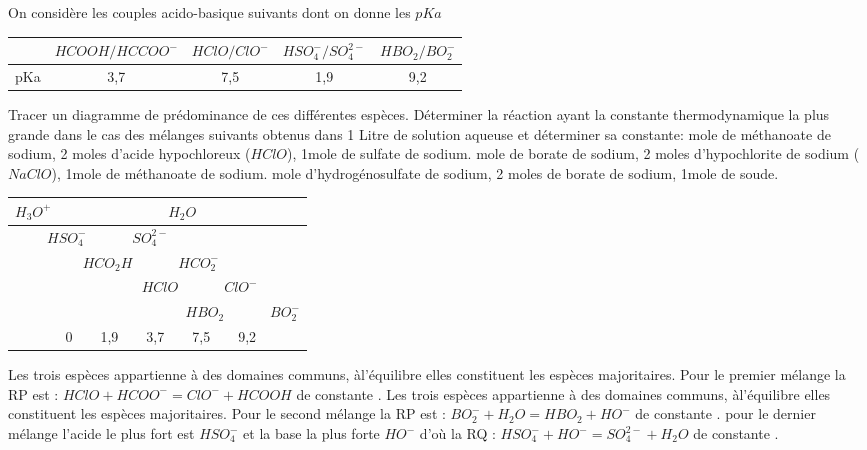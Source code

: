 \begin{Exercise}[title=]
	On considère  les couples acido-basique suivants dont on donne les $pKa$
	\begin{center}
		\begin{tabular}{c|c|c|c|c|}
		 &$HCOOH/HCCOO^-$ & $HClO/ClO^-$ & $HSO_4^-/SO_4^{2-}$ &$HBO_2/BO_2^-$\\
		 \hline
		 pKa & 3,7 & 7,5 & 1,9 & 9,2
	\end{tabular}
	\end{center}
\Question Tracer un diagramme de prédominance de ces différentes espèces.
\Question Déterminer la réaction ayant la constante thermodynamique la plus grande dans le cas des mélanges suivants obtenus dans 1 Litre de solution aqueuse et déterminer sa constante:
 mole de méthanoate de sodium, 2 moles d'acide hypochloreux ($HClO$), 1mole de sulfate de sodium.
 mole de borate de sodium, 2 moles d'hypochlorite de sodium ($NaClO$), 1mole de méthanoate de sodium.
 mole d'hydrogénosulfate de sodium, 2 moles de borate de sodium, 1mole de soude.

\end{Exercise}
\begin{Answer}
	\Question
\begin{center}
\begin{tabular}{cccccccccccc}
 	$H_3O^+$&\vline &\multicolumn{9}{c}{$H_2O$}	 								 \\ \hline
	\multicolumn{3}{r}{ $HSO_4^-$ }	&\vline & \multicolumn{7}{l}{$SO_4^{2-}$}	 \\ \hline
	\multicolumn{5}{r}{$HCO_2H$}	&\vline	& \multicolumn{5}{l}{$HCO_2^-$} 	 \\ \hline
	\multicolumn{7}{r}{$HClO$} 		&\vline &\multicolumn{3}{l}{$ClO^-$}		 \\ \hline
	\multicolumn{9}{r}{$HBO_2$}		&\vline &\multicolumn{2}{l}{$BO_2^-$}		 \\ \hline
		&	0	&			& 1,9	&			&	3,7	&			&	7,5	&		&	9,2	&		 \\
\end{tabular}
\end{center}
\Question Les trois espèces appartienne à des domaines communs, àl'équilibre elles constituent les espèces majoritaires. Pour le premier mélange la RP est : $HClO+HCOO^- =ClO^-+HCOOH$ de constante .
\Question Les trois espèces appartienne à des domaines communs, àl'équilibre elles constituent les espèces majoritaires. Pour le second mélange la RP est : $BO_2^-+H_2O = HBO_2+HO^-$ de constante .
\Question  pour le dernier mélange l'acide le plus fort est $HSO_4^{-}$ et la base la plus forte $HO^-$ d'où la RQ :
$HSO_4^{-}+HO^- =SO_4^{2-}+H_2O$ de constante .

\end{Answer}
